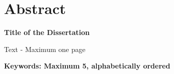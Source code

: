 \chapter{Abstract}
\begin{center}
\textbf{Title of the Dissertation}
\end{center}

Text - Maximum one page \newline

\textbf{Keywords: Maximum 5, alphabetically ordered}
